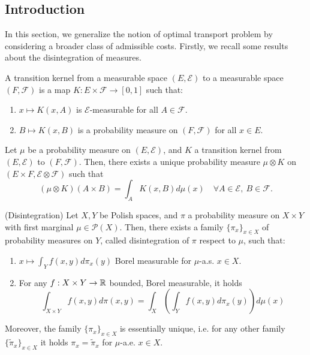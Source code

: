 \documentclass[../main.tex]{subfiles}
\begin{document}

\subsection{Introduction}
In this section, we generalize the notion of optimal transport problem by considering a broader class of admissible costs. Firstly, we recall some results about the disintegration of measures.

\begin{definition}
    A transition kernel from a measurable space $(E, \mathcal{E})$ to a measurable space $(F, \mathcal{F})$ is a map $K : E \times \mathcal{F} \to [0,1]$ such that:
    \begin{enumerate}
        \item $x \mapsto K(x, A)$ is $\mathcal{E}$-measurable for all $A\in\mathcal{F}$.
        \item $B \mapsto K(x, B)$ is a probability measure on $(F, \mathcal{F})$ for all $x\in E$.
    \end{enumerate}
\end{definition}

\begin{theorem}
    Let $\mu$ be a probability measure on $(E, \mathcal{E})$, and $K$ a transition kernel from $(E, \mathcal{E})$ to $(F, \mathcal{F})$. Then, there exists a unique probability measure $\mu\otimes K$ on $(E\times F, \mathcal{E}\otimes\mathcal{F})$ such that 
    $$
    (\mu\otimes K) (A\times B) = \int_A K(x, B) d\mu(x) \quad \forall A\in\mathcal{E}, \ B\in\mathcal{F}.
    $$
\end{theorem}

\begin{theorem} (Disintegration)
    Let $X, Y$ be Polish spaces, and $\pi$ a probability measure on $X\times Y$ with first marginal $\mu\in\mathcal{P}(X)$. Then, there exists a family $\{\pi_x\}_{x\in X}$ of probability measures on $Y$, called disintegration of $\pi$ respect to $\mu$, such that:
    \begin{enumerate}
        \item $x \mapsto \int_Y f(x, y) d\pi_x(y)$ Borel measurable for $\mu$-a.s. $x\in X$.
        \item For any $f: X \times Y \to \mathbb{R}$ bounded, Borel measurable, it holds
        $$
        \int_{X\times Y} f(x, y) d\pi(x, y) = \int_X \left(\int_Y f(x, y) d\pi_x(y) \right) d\mu(x)
        $$
    \end{enumerate}
    Moreover, the family $\{\pi_x\}_{x\in X}$ is essentially unique, i.e. for any other family $\{\tilde\pi_x\}_{x\in X}$ it holds $\pi_x = \tilde \pi_x$ for $\mu$-a.e. $x\in X$.
\end{theorem}
\end{document}
